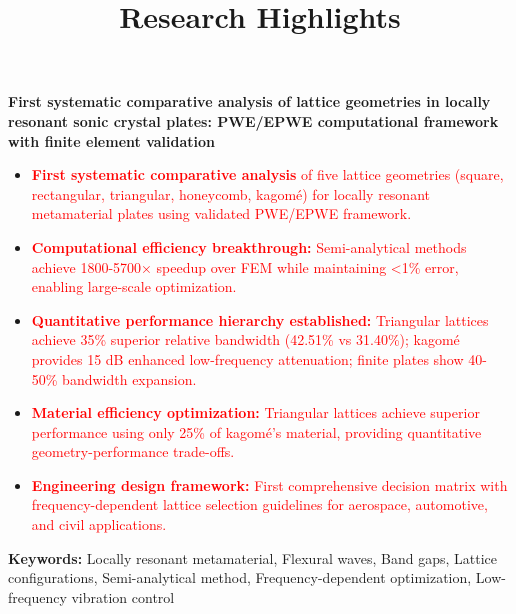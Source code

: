 \documentclass[11pt]{article}
\title{\textbf{Research Highlights}}
\author{}
\date{}
\begin{document}
\maketitle

\vspace{-1cm}

\textbf{First systematic comparative analysis of lattice geometries in locally resonant sonic crystal plates: PWE/EPWE computational framework with finite element validation}

\vspace{0.5cm}

\begin{itemize}[leftmargin=0.5cm, itemsep=0.3cm]

\item \textcolor{red}{\textbf{First systematic comparative analysis} of five lattice geometries (square, rectangular, triangular, honeycomb, kagomé) for locally resonant metamaterial plates using validated PWE/EPWE framework.}

\item \textcolor{red}{\textbf{Computational efficiency breakthrough:} Semi-analytical methods achieve 1800-5700× speedup over FEM while maintaining <1\% error, enabling large-scale optimization.}

\item \textcolor{red}{\textbf{Quantitative performance hierarchy established:} Triangular lattices achieve 35\% superior relative bandwidth (42.51\% vs 31.40\%); kagomé provides 15 dB enhanced low-frequency attenuation; finite plates show 40-50\% bandwidth expansion.}

\item \textcolor{red}{\textbf{Material efficiency optimization:} Triangular lattices achieve superior performance using only 25\% of kagomé's material, providing quantitative geometry-performance trade-offs.}

\item \textcolor{red}{\textbf{Engineering design framework:} First comprehensive decision matrix with frequency-dependent lattice selection guidelines for aerospace, automotive, and civil applications.}

\end{itemize}

\vspace{0.5cm}

\textbf{Keywords:} Locally resonant metamaterial, Flexural waves, Band gaps, Lattice configurations, Semi-analytical method, Frequency-dependent optimization, Low-frequency vibration control
\end{document}
